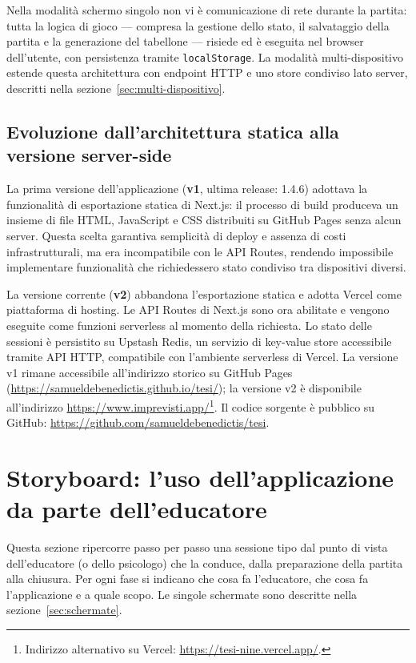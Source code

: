 \documentclass[12pt]{report}
\begin{document}
Nella modalità schermo singolo non vi è comunicazione di rete durante la partita: tutta la logica di gioco --- compresa la gestione dello stato, il salvataggio della partita e la generazione del tabellone --- risiede ed è eseguita nel browser dell'utente, con persistenza tramite \texttt{localStorage}. La modalità multi-dispositivo estende questa architettura con endpoint HTTP e uno store condiviso lato server, descritti nella sezione~\ref{sec:multi-dispositivo}.

\subsection{Evoluzione dall'architettura statica alla versione server-side}
\label{sec:evoluzione-architettura}

La prima versione dell'applicazione (\textbf{v1}, ultima release: 1.4.6) adottava la funzionalità di esportazione statica di Next.js: il processo di build produceva un insieme di file HTML, JavaScript e CSS distribuiti su GitHub Pages senza alcun server. Questa scelta garantiva semplicità di deploy e assenza di costi infrastrutturali, ma era incompatibile con le API Routes, rendendo impossibile implementare funzionalità che richiedessero stato condiviso tra dispositivi diversi.

La versione corrente (\textbf{v2}) abbandona l'esportazione statica e adotta Vercel come piattaforma di hosting. Le API Routes di Next.js sono ora abilitate e vengono eseguite come funzioni serverless al momento della richiesta. Lo stato delle sessioni è persistito su Upstash Redis, un servizio di key-value store accessibile tramite API HTTP, compatibile con l'ambiente serverless di Vercel. La versione v1 rimane accessibile all'indirizzo storico su GitHub Pages (\url{https://samueldebenedictis.github.io/tesi/}); la versione v2 è disponibile all'indirizzo \url{https://www.imprevisti.app/}\footnote{Indirizzo alternativo su Vercel: \url{https://tesi-nine.vercel.app/}.}. Il codice sorgente è pubblico su GitHub: \url{https://github.com/samueldebenedictis/tesi}.

\section{Storyboard: l'uso dell'applicazione da parte dell'educatore}
\label{sec:storyboard}

Questa sezione ripercorre passo per passo una sessione tipo dal punto di vista dell'educatore (o dello psicologo) che la conduce, dalla preparazione della partita alla chiusura. Per ogni fase si indicano che cosa fa l'educatore, che cosa fa l'applicazione e a quale scopo. Le singole schermate sono descritte nella sezione~\ref{sec:schermate}.
\end{document}
